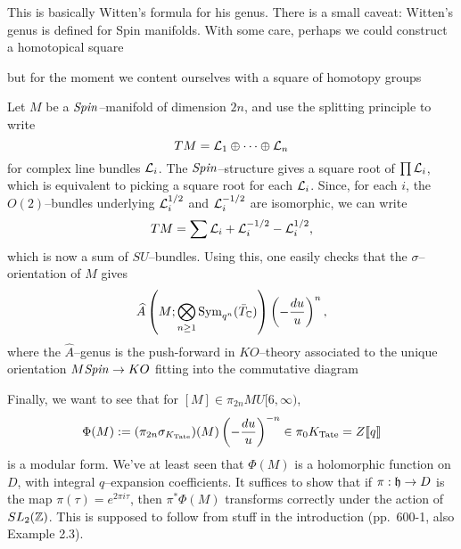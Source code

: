 This is basically Witten's formula for his genus.  There is a small caveat: Witten's genus is defined for Spin manifolds.  With some care, perhaps we could construct a homotopical square
\begin{center}
\end{center}
but for the moment we content ourselves with a square of homotopy groups
\begin{center}
\end{center}
Let $M$ be a $\mathit{Spin}$--manifold of dimension $2n$, and use the splitting principle to write \[TM = \mathcal{L}_1 \oplus \cdots \oplus \mathcal{L}_n\] for complex line bundles $\mathcal{L}_i$.  The $\mathit{Spin}$--structure gives a square root of $\prod \mathcal{L}_i$, which is equivalent to picking a square root for each $\mathcal{L}_i$.  Since, for each $i$, the $O(2)$--bundles underlying $\mathcal{L}_i^{1/2}$ and $\mathcal{L}_i^{-1/2}$ are isomorphic, we can write \[TM = \sum \mathcal{L}_i + \mathcal{L}_i^{-1/2} - \mathcal{L}_i^{1/2},\] which is now a sum of $SU$--bundles.  Using this, one easily checks that the $\sigma$--orientation of $M$ gives \[\widehat A \left(M; \bigotimes_{n \ge 1} \operatorname{Sym}_{q^n}(\bar T_{\mathbb{C}}) \right) \left(-\frac{du}{u}\right)^n,\] where the $\widehat A$--genus is the push-forward in $KO$--theory associated to the unique orientation $M\mathit{Spin} \to KO$ fitting into the commutative diagram
\begin{center}
\end{center}

Finally, we want to see that for $[M] \in \pi_{2n} MU[6, \infty)$, \[\Phi(M) := (\pi_{2n} \sigma_{K_{\mathrm{Tate}}})(M) \left( -\frac{du}{u} \right)^{-n} \in \pi_0 K_{\mathrm{Tate}} = Z\llbracket{q}\rrbracket\] is a modular form.  We've at least seen that $\Phi(M)$ is a holomorphic function on $D$, with integral $q$--expansion coefficients.  It suffices to show that if $\pi: \mathfrak h \to D$ is the map $\pi(\tau) = e^{2 \pi i \tau}$, then $\pi^* \Phi(M)$ transforms correctly under the action of $SL_2(\mathbb Z)$.  This is supposed to follow from stuff in the introduction (pp.\ 600-1, also Example 2.3).









